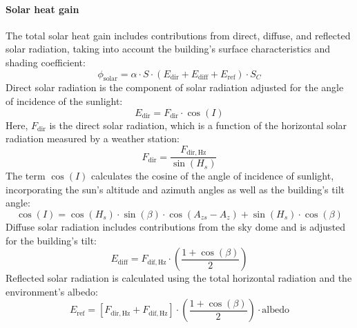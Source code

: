 \documentclass[runningheads]{llncs}
\begin{document}
\paragraph{Solar heat gain} The total solar heat gain includes contributions from direct, diffuse, and reflected solar radiation, taking into account the building’s surface characteristics and shading coefficient:
\begin{equation}
  \phi_{\mathrm{solar}} = \alpha \cdot S \cdot \left( E_{\mathrm{dir}} + E_{\mathrm{diff}} + E_{\mathrm{ref}} \right) \cdot S_C
\end{equation}
Direct solar radiation is the component of solar radiation adjusted for the angle of incidence of the sunlight:
\begin{equation}
  E_{\mathrm{dir}} = F_{\mathrm{dir}} \cdot \cos(I)
\end{equation}
Here, $F_{\mathrm{dir}}$ is the direct solar radiation, which is a function of the horizontal solar radiation measured by a weather station:
\begin{equation}
  F_{\mathrm{dir}} = \dfrac{F_{\mathrm{dir,Hz}}}{\sin(H_s)}
\end{equation}
The term $\cos(I)$ calculates the cosine of the angle of incidence of sunlight, incorporating the sun's altitude and azimuth angles as well as the building's tilt angle:
\begin{equation}
  \cos(I) = \cos(H_s) \cdot \sin(\beta) \cdot \cos(A_{zs} - A_z) + \sin(H_s) \cdot \cos(\beta)
\end{equation}
Diffuse solar radiation includes contributions from the sky dome and is adjusted for the building's tilt:
\begin{equation}
  E_{\mathrm{diff}} = F_{\mathrm{dif,Hz}} \cdot \left( \dfrac{1 + \cos(\beta)}{2} \right)
\end{equation}
Reflected solar radiation is calculated using the total horizontal radiation and the environment's albedo:
\begin{equation}
  E_{\mathrm{ref}} = \left[ F_{\mathrm{dir,Hz}} + F_{\mathrm{dif,Hz}} \right] \cdot \left( \dfrac{1 + \cos(\beta)}{2} \right) \cdot \text{albedo}
\end{equation}
\end{document}
